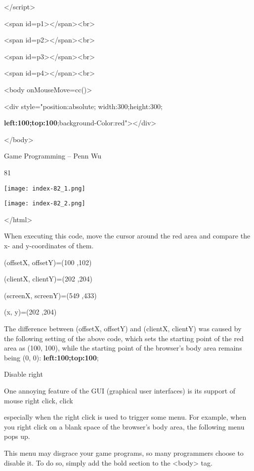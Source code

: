 \documentclass[
]{article}
\begin{document}
\textless/script\textgreater{}

\textless span
id=p1\textgreater\textless/span\textgreater\textless br\textgreater{}

\textless span
id=p2\textgreater\textless/span\textgreater\textless br\textgreater{}

\textless span
id=p3\textgreater\textless/span\textgreater\textless br\textgreater{}

\textless span
id=p4\textgreater\textless/span\textgreater\textless br\textgreater{}

\textless body onMouseMove=cc()\textgreater{}

\textless div style="position:absolute; width:300;height:300;

\textbf{left:100;top:100};background-Color:red"\textgreater\textless/div\textgreater{}

\textless/body\textgreater{}

Game Programming -- Penn Wu

81

\protect\hypertarget{index_split_006.htmlux5cux23p82}{}{}\texttt{[image: index-82\_1.png]}

\texttt{[image: index-82\_2.png]}

\textless/html\textgreater{}

When executing this code, move the cursor around the red area and
compare the x- and y-coordinates of them.

(offsetX, offsetY)=(100 ,102)

(clientX, clientY)=(202 ,204)

(screenX, screenY)=(549 ,433)

(x, y)=(202 ,204)

The difference between (offsetX, offsetY) and (clientX, clientY) was
caused by the following setting of the above code, which sets the
starting point of the red area as (100, 100), while the starting point
of the browser's body area remains being (0, 0):
\textbf{left:100;top:100};

Disable right

One annoying feature of the GUI (graphical user interfaces) is its
support of mouse right click, click

especially when the right click is used to trigger some menu. For
example, when you right click on a blank space of the browser's body
area, the following menu pops up.

This menu may disgrace your game programs, so many programmers choose to
disable it. To do so, simply add the bold section to the
\textless body\textgreater{} tag.
\end{document}

